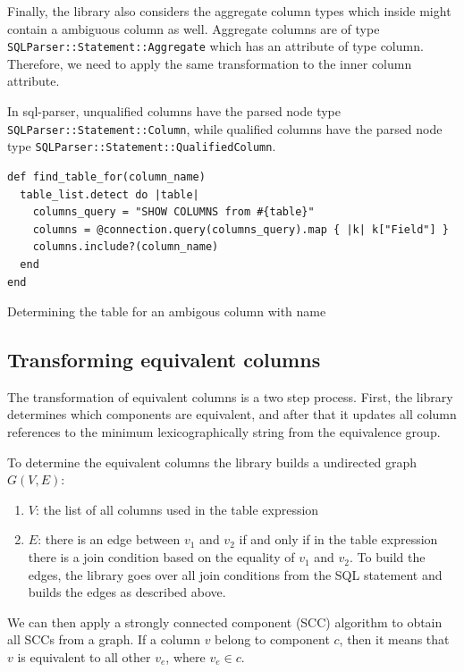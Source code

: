 Finally, the library also considers the aggregate column types which inside might contain a ambiguous column as well. Aggregate columns are of type \texttt{SQLParser::Statement::Aggregate} which has an attribute of type column. Therefore, we need to apply the same transformation to the inner column attribute.

In sql-parser, unqualified columns have the parsed node type \texttt{SQLParser::Statement::Column}, while qualified columns have the parsed node type \texttt{SQLParser::Statement::QualifiedColumn}.

\begin{listing}
\begin{verbatim}
def find_table_for(column_name)
  table_list.detect do |table|
    columns_query = "SHOW COLUMNS from #{table}"
    columns = @connection.query(columns_query).map { |k| k["Field"] }
    columns.include?(column_name)
  end
end
\end{verbatim}
\caption{Determining the table for an ambigous column with name}
\label{fig:find_table}
\end{listing}


\subsection{Transforming equivalent columns}

The transformation of equivalent columns is a two step process. First, the library determines which components are equivalent, and after that it updates all column references to the minimum lexicographically string from the equivalence group.

To determine the equivalent columns the library builds a undirected graph $G(V, E)$:
\begin{enumerate}
    \item $V$: the list of all columns used in the table expression
    \item $E$: there is an edge between $v_1$ and $v_2$ if and only if in the table expression there is a join condition based on the equality of $v_1$ and $v_2$. To build the edges, the library goes over all join conditions from the SQL statement and builds the edges as described above.
\end{enumerate}

We can then apply a strongly connected component (SCC) algorithm to obtain all SCCs from a graph. If a column $v$ belong to component $c$, then it means that $v$ is equivalent to all other $v_e$, where $v_e \in c$.


